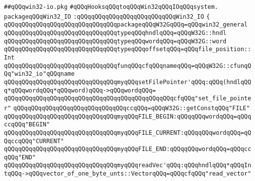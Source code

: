 \label{src/lib/std/src/win32/win32-io.pkg}
\verb|##qQQqwin32-io.pkg|\newline
\newline
\newline
\newline
\verb|#qQQqHooksqQQqtoqQQqWin32qQQqIOqQQqsystem.|\newline
\newline
\newline
\newline
\verb|packageqQQqWin32_IO|\newline
\verb|:qQQqqQQqqQQqqQQqqQQqqQQqqQQqWin32_IO|\newline
\verb|{|\newline
\verb|qQQqqQQqqQQqqQQqqQQqqQQqqQQqqQQqpackageqQQqW32GqQQq=qQQqwin32_general|\newline
\verb|qQQqqQQqqQQqqQQqqQQqqQQqqQQqqQQqtypeqQQqhndlqQQq=qQQqW32G::hndl|\newline
\newline
\verb|qQQqqQQqqQQqqQQqqQQqqQQqqQQqqQQqtypeqQQqwordqQQq=qQQqW32G::word|\newline
\newline
\verb|qQQqqQQqqQQqqQQqqQQqqQQqqQQqqQQqtypeqQQqoffsetqQQq=qQQqfile_position::Int|\newline
\newline
\verb|qQQqqQQqqQQqqQQqqQQqqQQqqQQqqQQqfunqQQqcfqQQqnameqQQq=qQQqW32G::cfunqQQq"win32_io"qQQqname|\newline
\newline
\verb|qQQqqQQqqQQqqQQqqQQqqQQqqQQqqQQqmyqQQqsetFilePointer'qQQq:qQQq(hndlqQQq*qQQqwordqQQq*qQQqword)qQQq->qQQqwordqQQq=|\newline
\verb|qQQqqQQqqQQqqQQqqQQqqQQqqQQqqQQqqQQqqQQqqQQqqQQqcfqQQq"set_file_pointer"|\newline
\newline
\verb|qQQqqQQqqQQqqQQqqQQqqQQqqQQqqQQqccqQQq=qQQqW32G::getConstqQQq"FILE"|\newline
\verb|qQQqqQQqqQQqqQQqqQQqqQQqqQQqqQQqmyqQQqFILE_BEGIN:qQQqqQQqwordqQQq=qQQqccqQQq"BEGIN"|\newline
\verb|qQQqqQQqqQQqqQQqqQQqqQQqqQQqqQQqmyqQQqFILE_CURRENT:qQQqqQQqwordqQQq=qQQqccqQQq"CURRENT"|\newline
\verb|qQQqqQQqqQQqqQQqqQQqqQQqqQQqqQQqmyqQQqFILE_END:qQQqqQQqwordqQQq=qQQqccqQQq"END"|\newline
\newline
\verb|qQQqqQQqqQQqqQQqqQQqqQQqqQQqqQQqmyqQQqreadVec'qQQq:qQQqhndlqQQq*qQQqIntqQQq->qQQqvector_of_one_byte_unts::VectorqQQq=qQQqcfqQQq"read_vector"|\newline
